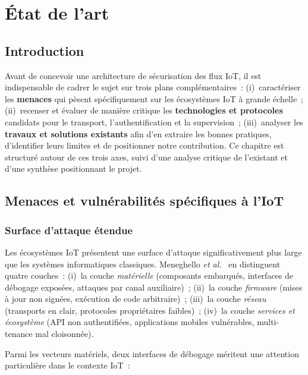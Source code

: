 \chapter{État de l'art}
\label{chap:etat-art}

\section{Introduction}
\label{sec:ea-intro}

Avant de concevoir une architecture de sécurisation des flux IoT, il est indispensable de cadrer le sujet sur trois plans complémentaires~: (i)~caractériser les \textbf{menaces} qui pèsent spécifiquement sur les écosystèmes IoT à grande échelle~; (ii)~recenser et évaluer de manière critique les \textbf{technologies et protocoles} candidats pour le transport, l'authentification et la supervision~; (iii)~analyser les \textbf{travaux et solutions existants} afin d'en extraire les bonnes pratiques, d'identifier leurs limites et de positionner notre contribution. Ce chapitre est structuré autour de ces trois axes, suivi d'une analyse critique de l'existant et d'une synthèse positionnant le projet.

\section{Menaces et vulnérabilités spécifiques à l'IoT}
\label{sec:ea-menaces}

\subsection{Surface d'attaque étendue}

Les écosystèmes IoT présentent une surface d'attaque significativement plus large que les systèmes informatiques classiques. Meneghello \emph{et al.}~\cite{meneghello2019iot} en distinguent quatre couches~: (i)~la couche \emph{matérielle} (composants embarqués, interfaces de débogage exposées, attaques par canal auxiliaire)~; (ii)~la couche \emph{firmware} (mises à jour non signées, exécution de code arbitraire)~; (iii)~la couche \emph{réseau} (transports en clair, protocoles propriétaires faibles)~; (iv)~la couche \emph{services et écosystème} (\acs{API} non authentifiées, applications mobiles vulnérables, multi-tenance mal cloisonnée).

Parmi les vecteurs matériels, deux interfaces de débogage méritent une attention particulière dans le contexte IoT~:

